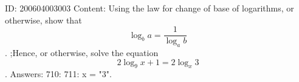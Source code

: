 \documentclass{article}
\begin{document}
ID: 200604003003
Content:
Using the law for change of base of logarithms, or otherwise, show that  $$\log _b a = \frac{1}{\log _a b}$$. ;Hence, or otherwise, solve the equation  $$2\log _9 x + 1 = 2\log _x 3$$. Answers:
710: 
711: x = "3".
\end{document}
